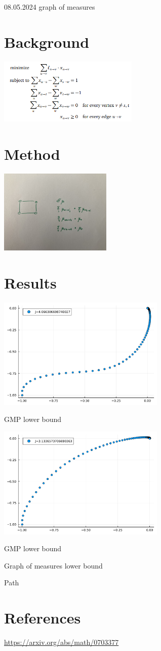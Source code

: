 \documentclass{article}
\begin{document}
08.05.2024 graph of measures

\section{Background}
\begin{center}\includegraphics[width=0.5\textwidth]{sp-lp.png}\end{center}

\section{Method}
\begin{center}\includegraphics[width=0.4\textwidth]{spp.JPEG}\end{center}

\section{Results}
\begin{center}\includegraphics[width=0.6\textwidth]{../img/miqp1.pdf}\end{center}
GMP lower bound 
\begin{center}\includegraphics[width=0.6\textwidth]{../img/miqp2.pdf}\end{center}
GMP lower bound 

Graph of measures lower bound 

Path 

\section{References}
\url{https://arxiv.org/abs/math/0703377}
\end{document}
